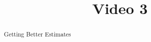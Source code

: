 \documentclass[handout]{ximera}
\title{Video 3}
\begin{document}
\begin{abstract}
Getting Better Estimates
\end{abstract}

\maketitle

\end{document}
